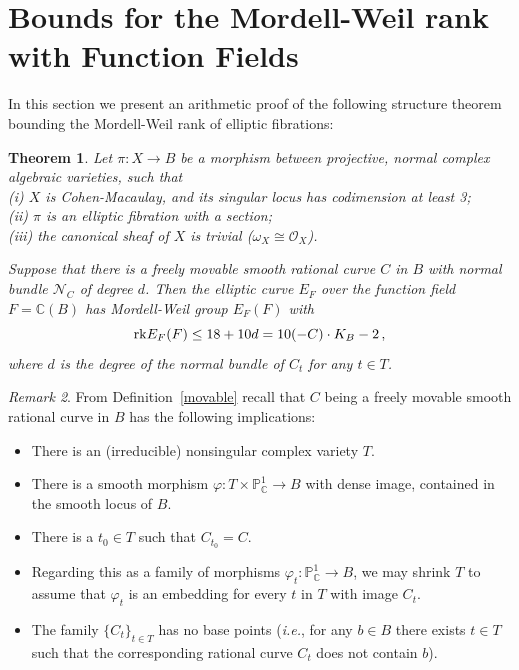 \documentclass[11pt]{amsart}
\newtheorem{theorem}{Theorem}[section]
\theoremstyle{definition}
\theoremstyle{definition}
\theoremstyle{remark}
\newtheorem{remark}[theorem]{Remark}
\theoremstyle{remark}
\theoremstyle{definition}
\theoremstyle{conjecture}
\begin{document}
\section{ 
Bounds for the Mordell-Weil rank with Function Fields } \label{sec:arithmproof}

{In this section we present an arithmetic proof of the following structure theorem bounding the Mordell-Weil rank of elliptic fibrations:}

\begin{theorem}\label{main2}
Let $\pi:X\to B$ be a morphism between projective, normal complex algebraic varieties, such that \\
(i) $X$ is Cohen-Macaulay, and its singular locus has codimension at least 3;\\
(ii) $\pi$ is an elliptic fibration with a section; \\
(iii) the canonical sheaf of $X$ is trivial ($\omega_X\cong {\mathcal O}_X$).

Suppose that there is a freely movable smooth rational curve $C$ in $B$ with normal bundle $\mathcal{N}_{C}$ of degree $d$.
 Then the elliptic curve $E_F$ over the function field $F={\mathbb C}(B)$
has Mordell-Weil group $E_F(F)$ with
\begin{equation}
       {\rm rk}E_F(F) \leq 18+10d = 10 (-C) \cdot K_B -2 \,,
\end{equation}
where $d$ is the degree of the normal bundle of $C_t$ for any $t\in T$.
\end{theorem}


\begin{remark}
From Definition~\ref{movable} recall that $C$ being a freely movable smooth rational curve in $B$ has the following implications:
\begin{itemize}
    \item There is an (irreducible) nonsingular complex variety $T$.
    \item There is a smooth morphism
$\varphi:T\times{\mathbb P}^1_{\mathbb C}\to B$ with dense image,
contained in the smooth locus of $B$.
    \item There is a $t_0\in T$ such that $C_{t_0}=C$.
    \item Regarding this as a family of morphisms $\varphi_t:{\mathbb
        P}^1_{\mathbb C}\to B$, we may shrink $T$ to assume that $\varphi_t$ is an embedding
        for every $t$ in $T$ with image $C_t$.
    \item The family $\{C_t\}_{t\in T}$ has no base points
({\it i.e.}, for any $b\in B$ there exists $t\in T$
such that the corresponding rational curve $C_t$ does not contain $b$).
\end{itemize}
\end{remark}
\color{black}
\end{document}

